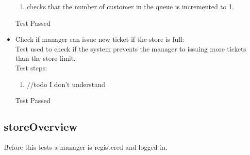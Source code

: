\begin{itemize}
\begin{enumerate}
        \item checks that the number of customer in the queue is incremented to 1.
    \end{enumerate}
    Test Passed

    \item Check if manager can issue new ticket if the store is full: \\
    Test used to check if the system prevents the manager to issuing more tickets than the store limit. \\
    Test steps: \\
    \begin{enumerate}
        \item //todo I don't understand
    \end{enumerate}
    Test Passed\\
\end{itemize}

\subsection{storeOverview}

Before this tests a manager is registered and logged in.

